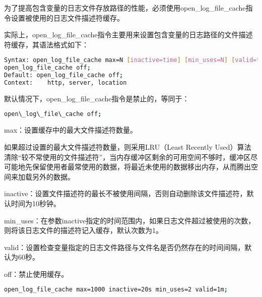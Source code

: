 为了提高包含变量的日志文件存放路径的性能，必须使用open\_log\_file\_cache指令设置被使用的日志文件描述符缓存。

实际上，open\_log\_file\_cache指令主要用来设置包含变量的日志路径的文件描述符缓存，其语法格式如下：


\begin{lstlisting}[language=bash]
Syntax: open_log_file_cache max=N [inactive=time] [min_uses=N] [valid=time];
open_log_file_cache off;
Default: open_log_file_cache off;
Context:	http, server, location
\end{lstlisting}


默认情况下，open\_log\_file\_cache指令是禁止的，等同于：

\begin{lstlisting}[language=bash]
open\_log\_file\_cache off;
\end{lstlisting}


\begin{compactitem}
\item max：设置缓存中的最大文件描述符数量。

如果超过设置的最大文件描述符数量，则采用LRU（Least Recently Used）算法清除“较不常使用的文件描述符”，当内存缓冲区剩余的可用空间不够时，缓冲区尽可能地先保留使用者最常使用的数据，将最近未使用的数据移出内存，从而腾出空间来加载另外的数据。

\item inactive：设置文件描述符的最长不被使用间隔，否则自动删除该文件描述符，默认时间为10秒钟。

\item min\_uses：在参数inactive指定的时间范围内，如果日志文件超过被使用的次数，则将该日志文件的描述符记入缓存，默认次数为1。

\item valid：设置检查变量指定的日志文件路径与文件名是否仍然存在的时间间隔，默认为60秒。

\item off：禁止使用缓存。

\end{compactitem}




\begin{lstlisting}[language=bash]
open_log_file_cache max=1000 inactive=20s min_uses=2 valid=1m;
\end{lstlisting}




\begin{lstlisting}[language=bash]

\end{lstlisting}



